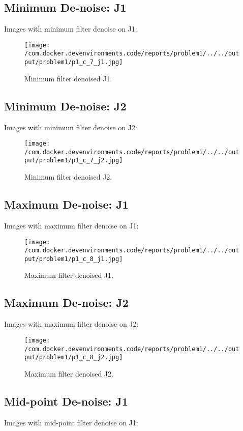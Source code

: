 \documentclass{article}%
\begin{document}
%
\subsection{Minimum De{-}noise: J1}%
\label{subsec:MinimumDe{-}noiseJ1}%
Images with minimum filter denoise on J1:%


\begin{figure}[h!]%
\centering%
\texttt{[image: /com.docker.devenvironments.code/reports/problem1/../../output/problem1/p1\_c\_7\_j1.jpg]}%
\caption{Minimum filter denoised J1.}%
\end{figure}

%
\subsection{Minimum De{-}noise: J2}%
\label{subsec:MinimumDe{-}noiseJ2}%
Images with minimum filter denoise on J2:%


\begin{figure}[h!]%
\centering%
\texttt{[image: /com.docker.devenvironments.code/reports/problem1/../../output/problem1/p1\_c\_7\_j2.jpg]}%
\caption{Minimum filter denoised J2.}%
\end{figure}

%
\newpage%
\subsection{Maximum De{-}noise: J1}%
\label{subsec:MaximumDe{-}noiseJ1}%
Images with maximum filter denoise on J1:%


\begin{figure}[h!]%
\centering%
\texttt{[image: /com.docker.devenvironments.code/reports/problem1/../../output/problem1/p1\_c\_8\_j1.jpg]}%
\caption{Maximum filter denoised J1.}%
\end{figure}

%
\subsection{Maximum De{-}noise: J2}%
\label{subsec:MaximumDe{-}noiseJ2}%
Images with maximum filter denoise on J2:%


\begin{figure}[h!]%
\centering%
\texttt{[image: /com.docker.devenvironments.code/reports/problem1/../../output/problem1/p1\_c\_8\_j2.jpg]}%
\caption{Maximum filter denoised J2.}%
\end{figure}

%
\subsection{Mid{-}point De{-}noise: J1}%
\label{subsec:Mid{-}pointDe{-}noiseJ1}%
Images with mid{-}point filter denoise on J1:%
\end{document}
